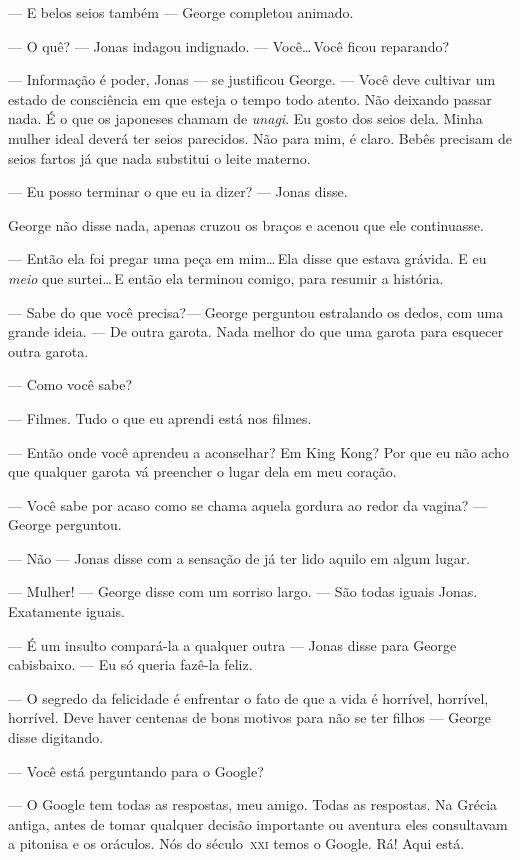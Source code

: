 --- E belos seios também --- George completou animado.

--- O quê? --- Jonas indagou indignado. --- Você\ldots\,Você ficou reparando?

--- Informação é poder, Jonas --- se justificou George. --- Você deve cultivar um estado de consciência em que esteja o tempo todo atento. Não deixando passar nada. É o que os japoneses chamam de \emph{unagi}. Eu gosto dos seios dela. Minha mulher ideal deverá ter seios parecidos. Não para mim, é claro. Bebês precisam de seios fartos já que nada substitui o leite materno.

--- Eu posso terminar o que eu ia dizer? --- Jonas disse.

George não disse nada, apenas cruzou os braços e acenou que ele continuasse.

--- Então ela foi pregar uma peça em mim\ldots\,Ela disse que estava grávida. E eu \emph{meio} que surtei\ldots\,E então ela terminou comigo, para resumir a história.

--- Sabe do que você precisa?--- George perguntou\mudanca{,} estralando os dedos, com uma grande ideia. --- De outra garota. Nada melhor do que uma garota para esquecer outra garota.

--- Como você sabe?

--- Filmes. Tudo o que eu aprendi está nos filmes.

--- Então onde você aprendeu a aconselhar? Em King Kong? Por que eu não acho que qualquer garota vá preencher o lugar dela em meu coração.

--- Você sabe por acaso como se chama aquela gordura ao redor da vagina? --- George perguntou.

--- Não --- Jonas disse\mudanca{,} com a sensação de já ter lido aquilo em algum lugar.

--- Mulher! --- George disse\mudanca{,} com um sorriso largo. --- São todas iguais Jonas. Exatamente iguais.

--- É um insulto compará-la a qualquer outra --- Jonas disse para George\mudanca{,} cabisbaixo. --- Eu só queria fazê-la feliz.

--- O segredo da felicidade é enfrentar o fato de que a vida é horrível, horrível, horrível. Deve haver centenas de bons motivos para não se ter filhos --- George disse\mudanca{,} digitando.

--- Você está perguntando para o Google?

--- O Google tem todas as respostas, meu amigo. Todas as respostas. Na Grécia antiga, antes de tomar qualquer decisão importante ou aventura\mudanca{,} eles consultavam a pitonisa e os oráculos. Nós do século~\textsc{xxi} temos o Google. Rá! Aqui está.

